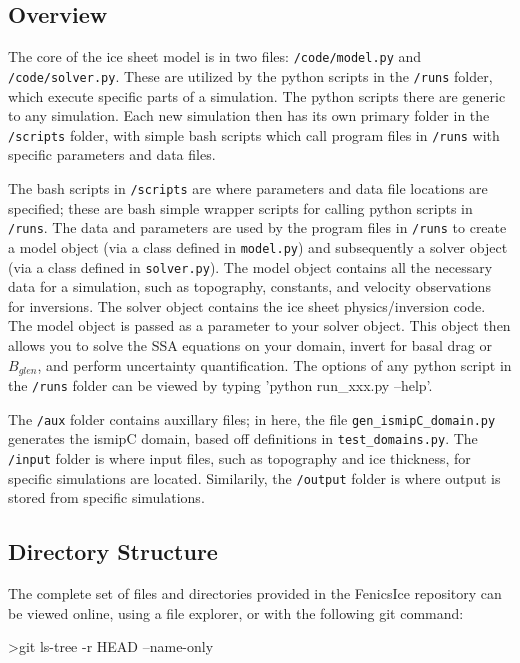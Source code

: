 \documentclass[11pt, reqno, nocenter]{article}
\begin{document}
\subsection{Overview}

The core of the ice sheet model is in two files: {\tt /code/model.py} and {\tt /code/solver.py}. These are utilized by the python scripts in the {\tt /runs} folder, which execute specific parts of a simulation. The python scripts there are generic to any simulation. Each new simulation then has its own primary folder in the {\tt /scripts} folder, with simple bash scripts which call program files in {\tt /runs} with specific parameters and data files.

The bash scripts in {\tt /scripts} are where parameters and data file locations are specified; these are bash simple wrapper scripts for calling python scripts in {\tt /runs}. The data and parameters are used by the program files in {\tt /runs} to create a model object (via a class defined in {\tt model.py}) and subsequently a solver object (via a class defined in {\tt solver.py}). The model object contains all the necessary data for a simulation, such as topography, constants, and velocity observations for inversions. The solver object contains the ice sheet physics/inversion code. The model object is passed as a parameter to your solver object. This object then allows you to solve the SSA equations \cite{MacAyeal1989} on your domain, invert for basal drag or $B_{glen}$, and perform uncertainty quantification. The options of any python script in the {\tt /runs} folder can be viewed by typing 'python run\_xxx.py --help'.


The {\tt /aux} folder contains auxillary files; in here, the file {\tt gen\_ismipC\_domain.py} generates the ismipC domain,  based off definitions in {\tt test\_domains.py}. The {\tt /input} folder is where input files, such as topography and ice thickness, for specific simulations are located. Similarily, the {\tt /output} folder is where output is stored from specific simulations.

\subsection{Directory Structure}

The complete set of files and directories provided in the FenicsIce repository can be viewed online, using a file explorer, or with the following git command:
\begin{spverbatim}
>git ls-tree -r HEAD --name-only
\end{spverbatim}
\end{document}
